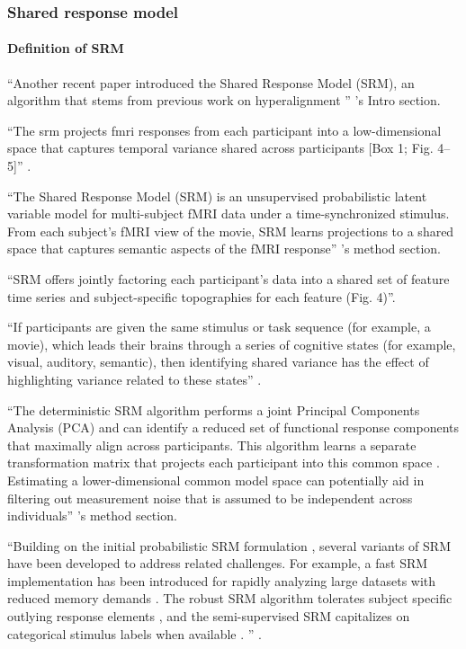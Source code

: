 \subsubsection{Shared response model}

\paragraph{Definition of SRM}

``Another recent paper \citep{chen2015reduced} introduced the Shared Response
Model (SRM), an algorithm that stems from previous work on hyperalignment
\citep{haxby2011common}'' \citep{vodrahalli2018mapping}'s Intro
section.

``The \ac{srm} \citep{chen2015reduced} projects \ac{fmri} responses from
each participant into a low-dimensional space that captures temporal variance
shared across participants [Box 1; Fig. 4–5]'' \citep{cohen2017computational}.

``The Shared Response Model (SRM) \citep{chen2015reduced} is an unsupervised
probabilistic latent variable model for multi-subject fMRI data under a
time-synchronized stimulus. From each subject's fMRI view of the movie, SRM
learns projections to a shared space that captures semantic aspects of the
fMRI response'' \citep{vodrahalli2018mapping}'s method section.

%
``SRM offers jointly factoring each participant's data into a shared set of
feature time series and subject-specific topographies for each feature (Fig.
4)''\citep{cohen2017computational}.

%
``If participants are given the same stimulus or task sequence (for example, a
movie), which leads their brains through a series of cognitive states (for
example, visual, auditory, semantic), then identifying shared variance has the
effect of highlighting variance related to these states''
\citep{cohen2017computational}.

%
``The deterministic SRM algorithm performs a joint Principal Components Analysis
(PCA) and can identify a reduced set of functional response components that
maximally align across participants. This algorithm learns a separate
transformation matrix that projects each participant into this common space
\citep{chen2015reduced}. Estimating a lower-dimensional common model space can
potentially aid in filtering out measurement noise that is assumed to be
independent across individuals'' \citep{chang2021endogenous}'s method
section.

%
``Building on the initial probabilistic SRM formulation \citep{chen2015reduced,
anderson2016enabling}, several variants of SRM have been developed to address
related challenges. For example, a fast SRM implementation has been introduced
for rapidly analyzing large datasets with reduced memory demands
\citep{richard2019fast}. The robust SRM algorithm tolerates subject specific
outlying response elements \citep{turek2018capturing}, and the semi-supervised
SRM capitalizes on categorical stimulus labels when available
\citep{turek2017semi}. '' \citep{kumar2020brainiak}.


